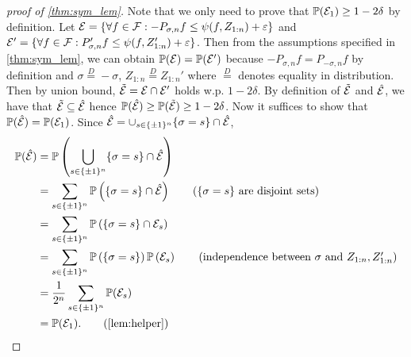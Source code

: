 \documentclass[twoside]{article}
\begin{document}
\begin{proof}[proof of \cref{thm:sym_lem}]
   Note that we only need to prove that $\mathbb{P}(\mathcal{E}_1)\ge 1-2\delta$ by definition. Let $\mathcal{E}=\{\forall f\in \mathcal{F}: -P_{\sigma,n}f\le \psi(f,Z_{1:n})+\varepsilon\}$ and $\mathcal{E}'=\{\forall f\in \mathcal{F}: P_{\sigma,n}'f\le \psi(f,Z_{1:n}')+\varepsilon\}$. 
   Then from the assumptions specified in \cref{thm:sym_lem}, we can obtain $\mathbb{P}(\mathcal{E})=\mathbb{P}(\mathcal{E}')$ because $-P_{\sigma,n}f=P_{-\sigma,n}f$ by definition and $\sigma\stackrel D=-\sigma$, $Z_{1:n}\stackrel{D}{=}Z_{1:n}'$ where $\stackrel{D}{=}$ denotes equality in distribution. Then by union bound, $\tilde {\mathcal{E}}=\mathcal{E}\cap \mathcal{E}'$ holds w.p. $1-2\delta$. By definition of $\tilde{\mathcal{E}}$ and $\hat{\mathcal{E}}$, we have that $\tilde{\mathcal{E}}\subseteq \hat{\mathcal{E}}$ hence $\mathbb{P}(\hat {\mathcal{E}})\ge \mathbb{P}(\tilde{\mathcal{E}})\ge 1-2\delta$. Now it suffices to show that $\mathbb{P}(\hat {\mathcal{E}})=\mathbb{P}(\mathcal{E}_1)$. Since $\hat {\mathcal{E}}=\cup_{s\in \{\pm 1\}^n}\{\sigma=s\}\cap \hat {\mathcal{E}}$,
   \begin{align*}
      \PP(\hat \cE)&=\PP\left(\bigcup_{s\in \{\pm 1\}^n}\{\sigma=s\}\cap \hat\cE\right)\\
      &=\sum_{s\in \{\pm 1\}^n}\PP\left(\{\sigma=s\}\cap \hat\cE\right)\tag{$\{\sigma=s\}$ are disjoint sets}\\
      &=\sum_{s\in \{\pm 1\}^n} \PP\left(\{\sigma=s\}\cap \cE_s\right)\\
      &=\sum_{s\in \{\pm 1\}^n} \PP\left(\{\sigma=s\}\right)\PP\left(\cE_s\right)\tag{independence between $\sigma$ and $Z_{1:n}, Z_{1:n}'$}\\
      &=\frac{1}{2^n}\sum_{s\in \{\pm 1\}^n}\PP(\cE_s)\\
      &=\PP(\cE_1).\tag{\cref{lem:helper}}
   \end{align*}
\end{proof}
\end{document}
